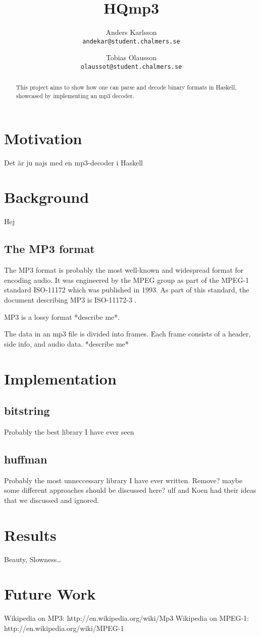 \documentclass[a4paper,12pt]{article}
\title{HQmp3}
\author{Anders Karlsson \\ \small{\texttt{andekar@student.chalmers.se}}
   \and Tobias Olausson \\ \small{\texttt{olaussot@student.chalmers.se}}
}
\begin{document}
\maketitle

\begin{abstract}
    This project aims to show how one can parse and decode binary formats in
    Haskell, showcased by implementing an mp3 decoder.
\end{abstract}

\tableofcontents

\section{Motivation}
    Det är ju najs med en mp3-decoder i Haskell

\section{Background}
    Hej
    \subsection{The MP3 format}
       The MP3 format is probably the most well-known and widespread format for
       encoding audio. It was engineered by the MPEG group as part of the MPEG-1
       standard ISO-11172 which was published in 1993. As part of this standard,
       the document describing MP3 is ISO-11172-3 \cite{wikimp3,wikimpeg1}.

       MP3 is a lossy format *describe me*.

       The data in an mp3 file is divided into frames. Each frame consists of
       a header, side info, and audio data. *describe me*

\section{Implementation}
    \subsection{bitstring}
        Probably the best library I have ever seen
    \subsection{huffman}
        Probably the most unneccessary library I have ever written. Remove?
        maybe some different approaches should be discussed here? ulf and Koen had their ideas that we discussed and ignored.

\section{Results}
    Beauty, Slowness\ldots

\section{Future Work}

\begin{thebibliography}{99}
        Wikipedia on MP3: http://en.wikipedia.org/wiki/Mp3
        Wikipedia on MPEG-1: http://en.wikipedia.org/wiki/MPEG-1
\end{thebibliography}
\end{document}

